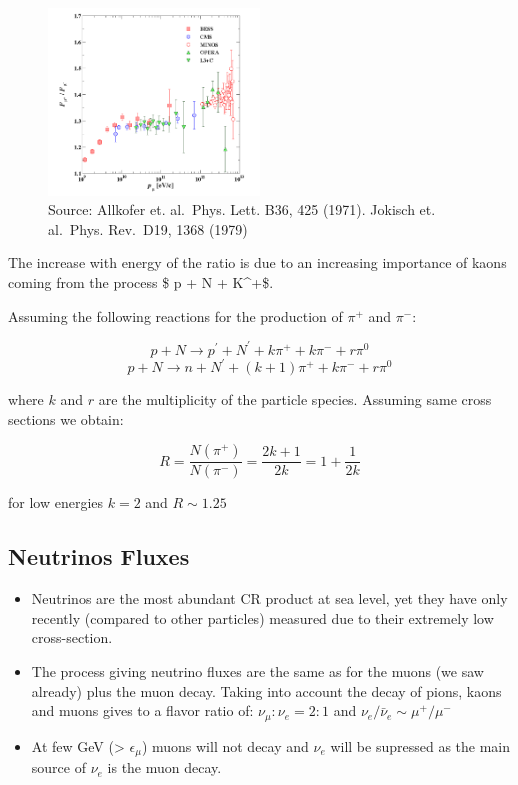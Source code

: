 \documentclass[
  letterpaper,
  DIV=11,
  numbers=noendperiod]{scrreprt}
\begin{document}
\begin{figure}[H]

{\centering \includegraphics[width=0.5\textwidth,height=\textheight]{images/muon_ratio.png}

}

\caption{Source: Allkofer et. al.~Phys. Lett. B36, 425 (1971). Jokisch
et. al.~Phys. Rev.~D19, 1368 (1979)}

\end{figure}%

The increase with energy of the ratio is due to an increasing importance
of kaons coming from the process \$ p + N \rightarrow \Lambda +
K\^{}+\$.

Assuming the following reactions for the production of \(\pi^+\) and
\(\pi^{-}\):

\[ p + N \rightarrow p^\prime + N^\prime  + k \pi^+ + k \pi^- + r\pi^0 \]
\[ p + N \rightarrow n + N^\prime  + (k + 1) \pi^+ + k \pi^- + r\pi^0 \]

where \(k\) and \(r\) are the multiplicity of the particle species.
Assuming same cross sections we obtain:

\[ R = \frac{N(\pi^+)}{N(\pi^-)} = \frac{2k+1}{2k} = 1 + \frac{1}{2k} \]

for low energies \(k = 2\) and \(R \sim 1.25\)

\subsection{Neutrinos Fluxes}\label{neutrinos-fluxes}

\begin{itemize}
\item
  Neutrinos are the most abundant CR product at sea level, yet they have
  only recently (compared to other particles) measured due to their
  extremely low cross-section.
\item
  The process giving neutrino fluxes are the same as for the muons (we
  saw already) plus the muon decay. Taking into account the decay of
  pions, kaons and muons gives to a flavor ratio of:
  \(\nu_\mu : \nu_e = 2:1\) and \(\nu_e/{\bar \nu_e} \sim \mu^+/\mu^-\)
\item
  At few GeV (\textgreater{} \(\epsilon_\mu\)) muons will not decay and
  \(\nu_e\) will be supressed as the main source of \(\nu_e\) is the
  muon decay.
\end{itemize}
\end{document}
